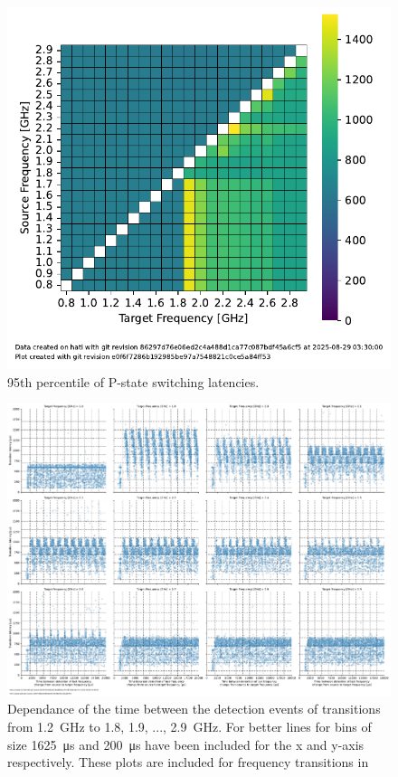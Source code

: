 \begin{figure}[]
    \centering
    \includegraphics[width=0.45\columnwidth]{fig/ftalat/ftalat_95percentQuantile_hati.pdf}
    \caption{\label{fig:pstate_latencies_95percentQuantile}95th percentile of P-state switching latencies.}
\end{figure}

\begin{figure}[]
    \centering
    \includegraphics[width=\columnwidth]{fig/ftalat/ftalat_scatter_wait_transition_latency_hati.pdf}
    \caption{\label{fig:pstate_latencies_time_dependance}Dependance of the time between the detection events of transitions from \SI{1.2}{\GHz} to \SI{1.8}{}, \SI{1.9}{}, ..., \SI{2.9}{\GHz}. For better lines for bins of size \SI{1625}{\us} and \SI{200}{\us} have been included for the x and y-axis respectively. These plots are included for frequency transitions in~}
\end{figure}

